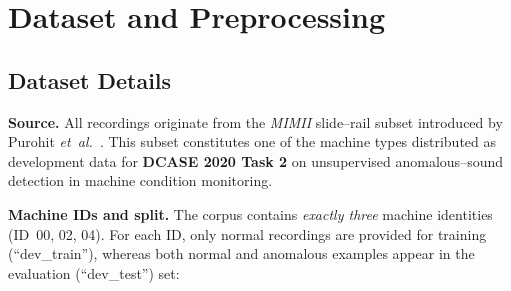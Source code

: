 \section{Dataset and Preprocessing}
\label{sec:Data Analysis and Preparation}




\subsection{Dataset Details}
\vspace{0.2em}
\noindent
\textbf{Source.}  
All recordings originate from the \emph{MIMII} slide–rail subset introduced by Purohit
\textit{et~al.}\ \cite{purohit2019mimii}.  
This subset constitutes one of the machine types distributed as
development data for \textbf{DCASE 2020 Task 2} on unsupervised anomalous–sound
detection in machine condition monitoring.

\noindent
\textbf{Machine IDs and split.}
The corpus contains \emph{exactly three} machine identities (ID~00, 02, 04).
For each ID, only normal recordings are provided for training
(``dev\_train''), whereas both normal and anomalous examples appear in the
evaluation (``dev\_test'') set:

